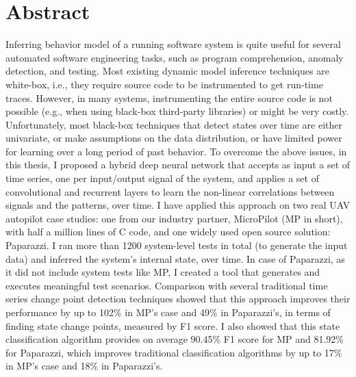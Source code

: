 
\chapter{Abstract}
Inferring behavior model of a running software system is quite useful for several automated software engineering tasks, such as program comprehension, anomaly detection, and testing. Most existing dynamic model inference techniques are white-box, i.e., they require source code to be instrumented to get run-time traces. However, in many systems, instrumenting the entire source code is not possible (e.g., when using black-box third-party libraries) or might be very costly. %
Unfortunately, most black-box techniques that detect states over time are either univariate, or make assumptions on the data distribution, or have limited power for learning over a long period of past behavior. 
To overcome the above issues, in this thesis, I proposed a hybrid deep neural network that accepts as input a set of time series, one per input/output signal of the system, and applies a set of convolutional and recurrent layers to learn the non-linear correlations between signals and the patterns, over time. 
I have applied this approach on two real UAV autopilot case studies: one from our industry partner, MicroPilot (MP in short), with half a million lines of C code, and one widely used open source solution: Paparazzi. 
I ran more than 1200 system-level tests in total (to generate the input data) and inferred the system's internal state, over time.
In case of Paparazzi, as it did not include system tests like MP, I created a tool that generates and executes meaningful test scenarios.
Comparison with several traditional time series change point detection techniques showed that this approach improves their performance by up to 102\% in MP's case and 49\% in Paparazzi's, in terms of finding state change points, measured by F1 score. I also showed that this state classification algorithm provides on average 90.45\% F1 score for MP and 81.92\% for Paparazzi, which improves traditional classification algorithms by up to 17\% in MP's case and 18\% in Paparazzi's.

